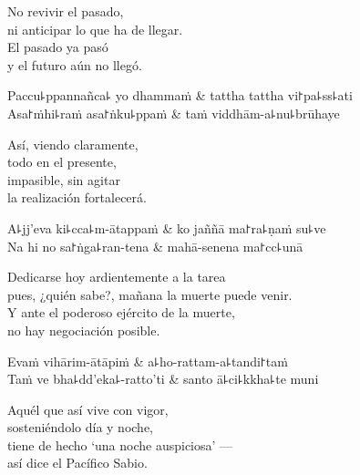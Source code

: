 \begin{english}
  No revivir el pasado,\\
  ni anticipar lo que ha de llegar.\\
  El pasado ya pasó\\
  y el futuro aún no llegó.
\end{english}

\begin{twochants}
  Paccu꜕ppannañca꜕ yo dhammaṁ & tattha tattha vi꜓pa꜕ss꜕ati \\
  Asa꜓ṁhi꜕raṁ asa꜓ṅku꜕ppaṁ & taṁ viddhām-a꜕nu꜕brūhaye \\
\end{twochants}

\begin{english}
  Así, viendo claramente,\\
  todo en el presente,\\
  impasible, sin agitar\\
  la realización fortalecerá.
\end{english}

\begin{twochants}
  A꜕jj'eva ki꜕cca꜕m-ātappaṁ & ko jaññā ma꜓ra꜕ṇaṁ su꜕ve \\
  Na hi no sa꜓ṅga꜕ran-tena & mahā-senena ma꜓cc꜕unā \\
\end{twochants}

\begin{english}
  Dedicarse hoy ardientemente a la tarea\\
  pues, ¿quién sabe?, mañana la muerte puede venir.\\
  Y ante el poderoso ejército de la muerte,\\
  no hay negociación posible.
\end{english}

\clearpage

\begin{twochants}
  Evaṁ vihārim-ātāpiṁ & a꜕ho-rattam-a꜕tandi꜓taṁ \\
  Taṁ ve bha꜕dd'eka꜕-ratto'ti & santo ā꜕ci꜕kkha꜕te muni \\
\end{twochants}

\begin{english}
  Aquél que así vive con vigor,\\
  sosteniéndolo día y noche,\\
  tiene de hecho `una noche auspiciosa’ ---\\
  así dice el Pacífico Sabio.
\end{english}

